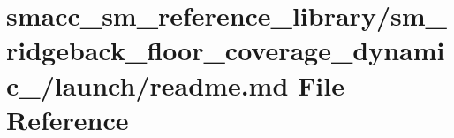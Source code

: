 \hypertarget{smacc__sm__reference__library_2sm__ridgeback__floor__coverage__dynamic__1_2launch_2readme_8md}{}\section{smacc\+\_\+sm\+\_\+reference\+\_\+library/sm\+\_\+ridgeback\+\_\+floor\+\_\+coverage\+\_\+dynamic\+\_/launch/readme.md File Reference}
\label{smacc__sm__reference__library_2sm__ridgeback__floor__coverage__dynamic__1_2launch_2readme_8md}
